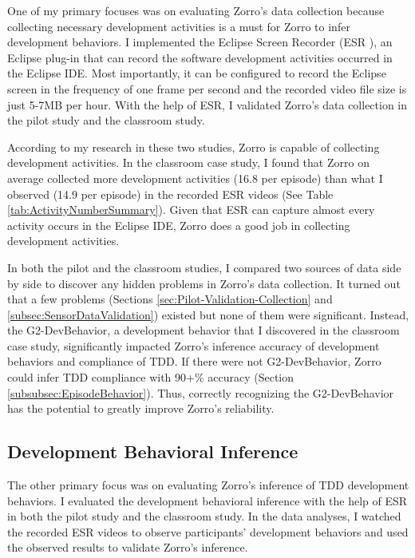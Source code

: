 One of my primary focuses was on evaluating Zorro's data collection because collecting necessary development activities is a must for Zorro to infer development behaviors. I implemented the Eclipse Screen Recorder (ESR \cite{esr}), an Eclipse plug-in that can record the software development activities occurred in the Eclipse IDE. Most importantly, it can be configured to  record the Eclipse screen in the frequency of one frame per second and the recorded video file size is just 5-7MB per hour. With the help of ESR, I validated Zorro's data collection in the pilot study and the classroom study. 

According to my research in these two studies, Zorro is capable of collecting development activities. In the classroom case study, I found that Zorro on average collected more development activities (16.8 per episode) than what I observed (14.9 per episode) in the recorded ESR videos (See Table \ref{tab:ActivityNumberSummary}). Given that ESR can capture almost every activity occurs in the Eclipse IDE, Zorro does a good job in collecting development activities. 

In both the pilot and the classroom studies, I compared two sources of data side by side to discover any hidden problems in Zorro's data collection. It turned out that a few problems (Sections \ref{sec:Pilot-Validation-Collection} and \ref{subsec:SensorDataValidation}) existed but none of them were significant. Instead, the G2-DevBehavior, a development behavior that I discovered in the classroom case study, significantly impacted Zorro's inference accuracy of development behaviors and compliance of TDD. If there were not G2-DevBehavior, Zorro could infer TDD compliance with 90+\% accuracy (Section \ref{subsubsec:EpisodeBehavior}). Thus, correctly recognizing the G2-DevBehavior has the potential to greatly improve Zorro's reliability. 

\subsection{Development Behavioral Inference} 

The other primary focus was on evaluating Zorro's inference of TDD development behaviors. I evaluated the development behavioral inference with the help of ESR in both the pilot study and the classroom study. In the data analyses, I watched the recorded ESR videos to observe participants' development behaviors and used the observed results to validate Zorro's inference. 

